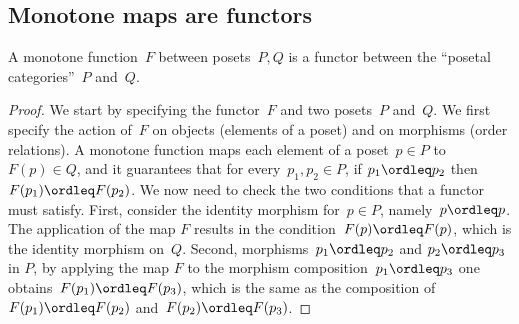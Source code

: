 \subsection{Monotone maps are functors}
\begin{lemma}
  \label{lemma:posetfunctor}
  A monotone function~$F$ between posets~$P,Q$ is a functor between the ``posetal categories''~$P$ and~$Q$.
\end{lemma}
\begin{proof}
  We start by specifying the functor~$F$ and two posets~$P$ and~$Q$. We first specify the action of~$F$ on objects (elements of a poset) and on morphisms (order relations). A monotone function maps each element of a poset~$p\in P$ to~$F(p) \in Q$, and it guarantees that for every~$p_1,p_2\in P$, if $p_1\ordleq p_2$ then~$F(p_1)\ordleq F(p_2)$. We now need to check the two conditions that a functor must satisfy. First, consider the identity morphism for~$p\in P$, namely~$p\ordleq p$. The application of the map $F$ results in the condition~$F(p)\ordleq F(p)$, which is the identity morphism on~$Q$. Second, morphisms~$p_1\ordleq p_2$ and $p_2\ordleq p_3$ in $P$, by applying the map $F$ to the morphism composition~$p_1\ordleq p_3$ one obtains~$F(p_1)\ordleq F(p_3)$, which is the same as the composition of~$F(p_1)\ordleq F(p_2)$ and~$F(p_2)\ordleq F(p_3)$.
\end{proof}
